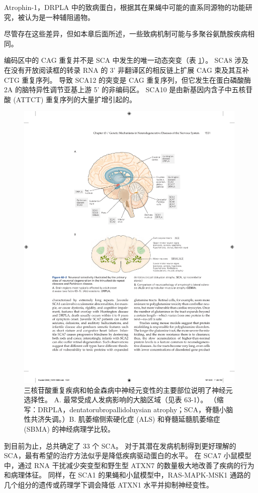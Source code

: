 Atrophin-1，DRPLA 中的致病蛋白，根据其在果蝇中可能的直系同源物的功能研究，被认为是一种辅阻遏物。

尽管存在这些差异，但如本章后面所述，一些致病机制可能与多聚谷氨酰胺疾病相同。

编码区中的 CAG 重复并不是 SCA 中发生的唯一动态突变（表 \ref{fig:63_2}）。 SCA8 涉及在没有开放阅读框的转录 RNA 的 3' 非翻译区的相反链上扩展 CAG 束及其互补 CTG 重复序列。 导致 SCA12 的突变是 CAG 重复序列，但它发生在蛋白磷酸酶 2A 的脑特异性调节亚基上游 5' 的非编码区。 SCA10 是由新基因内含子中五核苷酸 (ATTCT) 重复序列的大量扩增引起的。

\begin{figure}[htbp]
	\centering
	\includegraphics[width=0.7\linewidth]{chap63/fig_63_2}
	\caption{三核苷酸重复疾病和帕金森病中神经元变性的主要部位说明了神经元选择性。 A. 最常受成人发病影响的大脑区域（见表 63-1）。 （缩写：DRPLA，dentatorubropallidoluysian atrophy；SCA，脊髓小脑性共济失调。）B. 肌萎缩侧索硬化症 (ALS) 和脊髓延髓肌萎缩症 (SBMA) 的神经病理学比较。}
	\label{fig:63_2}
\end{figure}

到目前为止，总共确定了 33 个 SCA。 对于其潜在发病机制得到更好理解的 SCA，最有希望的治疗方法似乎是降低疾病驱动蛋白的水平。 在 SCA7 小鼠模型中，通过 RNA 干扰减少突变型和野生型 ATXN7 的数量极大地改善了疾病的行为和病理体征。 同样，在 SCA1 的果蝇和小鼠模型中，RAS-MAPK-MSK1 通路的几个组分的遗传或药理学下调会降低 ATXN1 水平并抑制神经变性。

